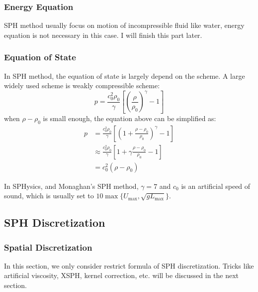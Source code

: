 \subsubsection{Energy Equation}

SPH method usually focus on motion of incompressible fluid like water, 
energy equation is not necessary in this case. 
I will finish this part later.

\subsubsection{Equation of State}

In SPH method, 
the equation of state is largely depend on the scheme. 
A large widely used scheme is weakly compressible scheme:
\begin{equation}
    \label{eq:Weakly Compressible Scheme}
    p = \frac{c_0^2\rho_0}{\gamma}
    \left[
        \left(\frac{\rho}{\rho_0}\right)^\gamma - 1
    \right]
\end{equation}
when $\rho-\rho_0$ is small enough, 
the equation above can be simplified as:
\begin{equation}
    \begin{aligned}
        p &= \frac{c_0^2\rho_0}{\gamma}
        \left[
            \left(1+\frac{\rho-\rho_0}{\rho_0}\right)^\gamma - 1
        \right]\\
        &\approx \frac{c_0^2\rho_0}{\gamma}
        \left[
            1 + \gamma\frac{\rho-\rho_0}{\rho_0} - 1
        \right]\\
        &= c_0^2 (\rho - \rho_0)
    \end{aligned}
\end{equation}

In SPHysics, and Monaghan's SPH method, $\gamma=7$ and $c_0$ is 
an artificial speed of sound, which is usually set to $10\max\{U_{\max},\sqrt{gL_{\max}}\}$.

\subsection{SPH Discretization}

\subsubsection{Spatial Discretization}

In this section, 
we only consider restrict formula of SPH discretization. 
Tricks like artificial viscosity, XSPH, kernel correction, etc. 
will be discussed in the next section.

